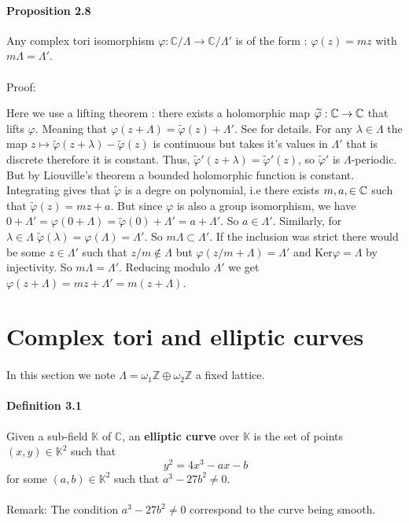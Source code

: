 \documentclass[letterpaper,10pt]{article}
\begin{document}
\paragraph{Proposition 2.8} Any complex tori isomorphism $\varphi : \mathbb{C} / \Lambda \to \mathbb{C} / \Lambda'$ is of the form : $\varphi(z) = mz$ 
with $m\Lambda = \Lambda'$.
{\itshape \paragraph{}Proof: } Here we use a lifting theorem : there exists a holomorphic map $\widetilde{\varphi}: \mathbb{C} \to \mathbb{C}$ that lifts $\varphi$. Meaning that 
$\varphi(z + \Lambda) = \widetilde{\varphi}(z) + \Lambda'$. See \cite{munkres} 
for details. For any $\lambda \in \Lambda$ the map $z\mapsto \widetilde{\varphi}(z + \lambda) - \widetilde{\varphi}(z)$ is continuous but takes it's values in $\Lambda'$ 
that is discrete therefore it is constant. Thus, $\widetilde{\varphi}'(z + \lambda) = \widetilde{\varphi}'(z)$, so $\widetilde{\varphi}'$ is $\Lambda$-periodic. But by 
Liouville's theorem a bounded holomorphic function is constant. Integrating gives that $\widetilde{\varphi}$ is a degre on polynomial, i.e there exists $m,a,\in \mathbb{C}$ such 
that $\widetilde{\varphi}(z) = mz + a$. But since $\varphi$ is also a group isomorphism, we have $0 + \Lambda' = \varphi(0 + \Lambda) = \widetilde{\varphi}(0) + \Lambda' 
 = a + \Lambda'$. So $a\in \Lambda'$. Similarly, for $\lambda \in \Lambda \; \widetilde{\varphi}(\lambda) = \varphi(\Lambda) = \Lambda'$. So $m\Lambda \subset \Lambda'$. 
 If the inclusion was strict there would be some $z\in \Lambda'$ such that $z/m \notin \Lambda$ but $\varphi(z/m + \Lambda) = \Lambda'$ and Ker$\varphi  = \Lambda$ by 
 injectivity. So $m\Lambda = \Lambda'$.
 Reducing modulo $\Lambda'$ we get $\varphi(z + \Lambda) = mz + \Lambda'= m(z + \Lambda)$.


\section{Complex tori and elliptic curves}%
\paragraph{} In this section we note $\Lambda = \omega_1\mathbb{Z} \oplus \omega_2\mathbb{Z}$ a fixed lattice.

\paragraph{Definition 3.1} Given a sub-field $\mathbb{K}$ of $\mathbb{C}$, an \textbf{elliptic curve} over $\mathbb{K}$ is the set of points $(x,y) \in \mathbb{K}^2$ such that 
\[\ y^2 = 4x^3 - ax - b \] for some $(a,b) \in \mathbb{K}^2$ such that $a^3-27b^2 \neq 0$.
{\itshape \paragraph{} Remark: The condition $a^3-27b^2 \neq 0$ correspond to the curve being smooth.
}
\end{document}
